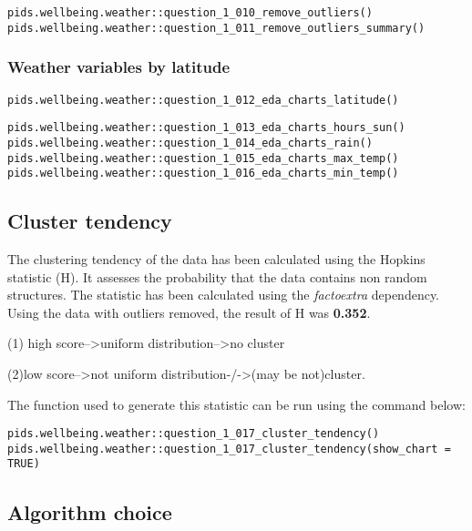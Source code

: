 \documentclass[12pt, oneside, openany]{book}
\begin{document}
\begin{verbatim}
pids.wellbeing.weather::question_1_010_remove_outliers()
pids.wellbeing.weather::question_1_011_remove_outliers_summary()
\end{verbatim}

\subsubsection*{Weather variables by latitude}

\begin{verbatim}
pids.wellbeing.weather::question_1_012_eda_charts_latitude()
\end{verbatim}

\begin{verbatim}
pids.wellbeing.weather::question_1_013_eda_charts_hours_sun()
pids.wellbeing.weather::question_1_014_eda_charts_rain()
pids.wellbeing.weather::question_1_015_eda_charts_max_temp()
pids.wellbeing.weather::question_1_016_eda_charts_min_temp()
\end{verbatim}

\subsection*{Cluster tendency}

The clustering tendency of the data has been calculated using the Hopkins statistic (H). It assesses the probability that the data contains non random structures. The statistic has been calculated using the \emph{factoextra} dependency. Using the data with outliers removed, the result of H was \textbf{0.352}. 

(1) high score-->uniform distribution-->no cluster

(2)low score-->not uniform distribution-/->(may be not)cluster. 


The function used to generate this statistic can be run using the command below:
\begin{verbatim}
pids.wellbeing.weather::question_1_017_cluster_tendency()
pids.wellbeing.weather::question_1_017_cluster_tendency(show_chart = TRUE)
\end{verbatim}

\subsection*{Algorithm choice}
\end{document}
